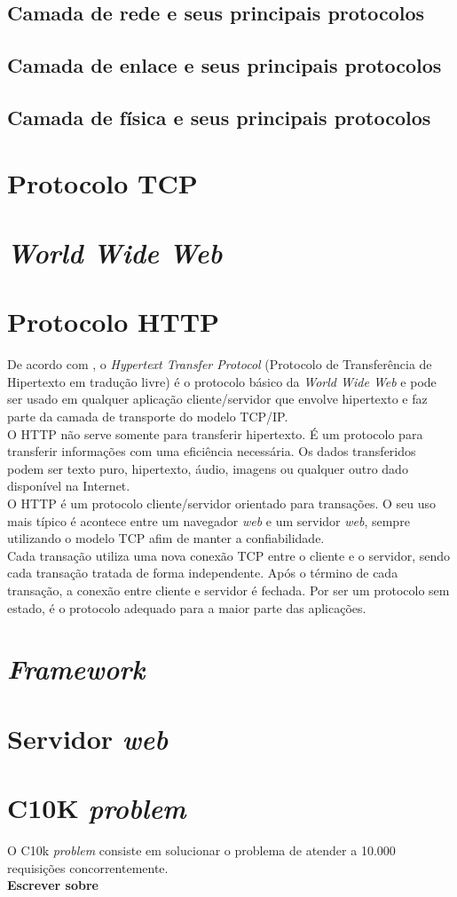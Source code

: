 \subsection{Camada de rede e seus principais protocolos}
\subsection{Camada de enlace e seus principais protocolos}
\subsection{Camada de física e seus principais protocolos}
\section{Protocolo TCP}
\section{\textit{World Wide Web}}
\section{Protocolo HTTP}
De acordo com , o \textit{Hypertext Transfer Protocol} (Protocolo de Transferência de Hipertexto em tradução livre) é o protocolo básico da \textit{World Wide Web} e pode ser usado em qualquer aplicação cliente/servidor que envolve hipertexto e faz parte da camada de transporte do modelo TCP/IP.\\
O HTTP não serve somente para transferir hipertexto. É um protocolo para transferir informações com uma eficiência necessária. Os dados transferidos podem ser texto puro, hipertexto, áudio, imagens ou qualquer outro dado disponível na Internet.\\
O HTTP é um protocolo cliente/servidor orientado para transações. O seu uso mais típico é acontece entre um navegador \textit{web} e um servidor \textit{web}, sempre utilizando o modelo TCP afim de manter a confiabilidade.\\
Cada transação utiliza uma nova conexão TCP entre o cliente e o servidor, sendo cada transação tratada de forma independente. Após o término de cada transação, a conexão entre cliente e servidor é fechada. Por ser um protocolo sem estado, é o protocolo adequado para a maior parte das aplicações.
\section{\textit{Framework}}
\section{Servidor \textit{web}}
\section{C10K \textit{problem}}
O C10k \textit{problem} consiste em solucionar o problema de atender a 10.000 requisições concorrentemente.\\
\textbf{Escrever sobre}